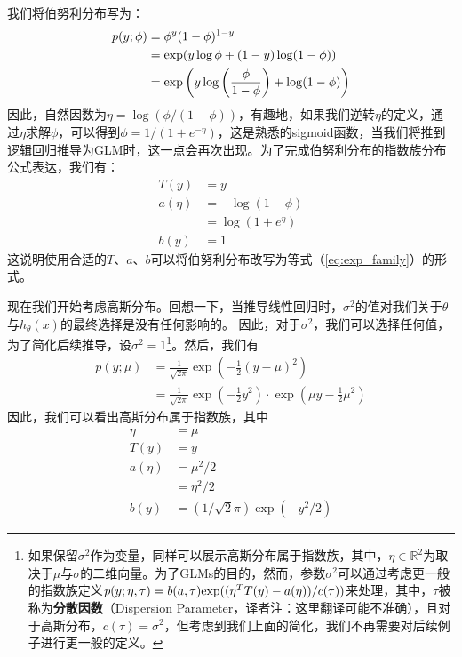 我们将伯努利分布写为：
\begin{equation}
  \begin{aligned}
    p(y;\phi) & = \phi^y (1-\phi)^{1-y}                                                            \\
              & ={\rm exp}(y \log \phi + (1-y) \log(1-\phi))                                       \\
              & ={\rm exp} \left( y \log \left( \frac{\phi}{1-\phi} \right) + \log(1-\phi) \right)
  \end{aligned}
\end{equation}
因此，自然因数为$\eta=\log(\phi / (1-\phi))$，有趣地，如果我们逆转$\eta$的定义，通过$\eta$求解$\phi$，可以得到$\phi=1 / (1+e^{-\eta})$，这是熟悉的sigmoid函数，当我们将推到逻辑回归推导为GLM时，这一点会再次出现。为了完成伯努利分布的指数族分布公式表达，我们有：
\begin{align*}
  T(y)    & = y               \\
  a(\eta) & = -\log(1-\phi)   \\
          & =  \log(1+e^\eta) \\
  b(y)    & =1
\end{align*}
这说明使用合适的$T$、$a$、$b$可以将伯努利分布改写为等式（\ref{eq:exp_family}）的形式。

现在我们开始考虑高斯分布。回想一下，当推导线性回归时，$\sigma^2$的值对我们关于$\theta$与$h_\theta(x)$的最终选择是没有任何影响的。
因此，对于$\sigma^2$，我们可以选择任何值，为了简化后续推导，设$\sigma^2=1$\footnote{如果保留$\sigma^2$作为变量，同样可以展示高斯分布属于指数族，其中，$\eta \in \mathbb{R}^2$为取决于$\mu$与$\sigma$的二维向量。为了GLMs的目的，然而，参数$\sigma^2$可以通过考虑更一般的指数族定义$p(y;\eta,\tau)=b(a,\tau){\rm exp}((\eta^T T(y) - a(\eta))/c(\tau))$来处理，其中，$\tau$被称为\textbf{分散因数}（Dispersion Parameter，译者注：这里翻译可能不准确），且对于高斯分布，$c(\tau)=\sigma^2$，但考虑到我们上面的简化，我们不再需要对后续例子进行更一般的定义。}。然后，我们有
\begin{align*}
  p(y;\mu) & =\frac{1}{\sqrt{2\pi}}\exp \left( -\frac{1}{2} (y-\mu)^2 \right)                                               \\
           & =\frac{1}{\sqrt{2\pi}}\exp \left( -\frac{1}{2} y^2 \right) \cdot \exp \left( \mu y - \frac{1}{2} \mu^2 \right)
\end{align*}
因此，我们可以看出高斯分布属于指数族，其中
\begin{align*}
  \eta    & = \mu                            \\
  T(y)    & = y                              \\
  a(\eta) & = \mu^2 / 2                      \\
          & = \eta^2 / 2                     \\
  b(y)    & = (1/\sqrt{2}\pi) \exp (- y^2/2)
\end{align*}

